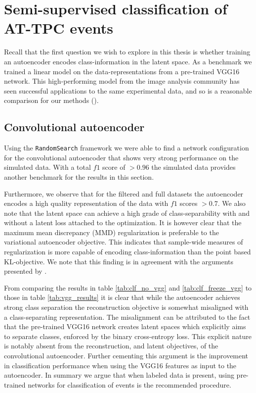 \section{Semi-supervised classification of AT-TPC events}

Recall that the first question we wish to explore in this thesis is whether training an autoencoder encodes class-information in the latent space. As a benchmark we trained a linear model on the data-representations from a pre-trained VGG16 network. This high-performing model from the image analysis community has seen successful applications to the same experimental data, and so is a reasonable comparison for our methods (\cite{Kuchera2019}). 

\subsection{Convolutional autoencoder}
Using the \lstinline{RandomSearch} framework we were able to find a network configuration for the convolutional autoencoder that shows very strong performance on the simulated data. With a total $f1$ score of $>0.96$ the simulated data provides another benchmark for the results in this section.

 Furthermore, we observe that for the filtered and full datasets the autoencoder encodes a high quality representation of the data with $f1$ scores $>0.7$. We also note that the latent space can achieve a high grade of class-separability with and without a latent loss attached to the optimization. It is however clear that the maximum mean discrepancy (MMD) regularization is preferable to the variational autoencoder objective. This indicates that sample-wide measures of regularization is more capable of encoding class-information than the point based KL-objective. We note that this finding is in agreement with the arguments presented by \citet{Zhao}. 

 From comparing the results in table \ref{tab:clf_no_vgg} and \ref{tab:clf_freeze_vgg} to those in table \ref{tab:vgg_results} it is clear that while the autoencoder achieves strong class separation the reconstruction objective is somewhat misaligned with a class-separating representation. The misalignment can be attributed to the fact that the pre-trained VGG16 network creates latent spaces which explicitly aims to separate classes, enforced by the binary cross-entropy loss. This explicit nature is notably absent from the reconstruction, and latent objectives, of the convolutional autoencoder. Further cementing this argument is the improvement in classification performance when using the VGG16 features as input to the autoencoder. In summary we argue that when labeled data is present, using pre-trained networks for classification of events is the recommended procedure.

